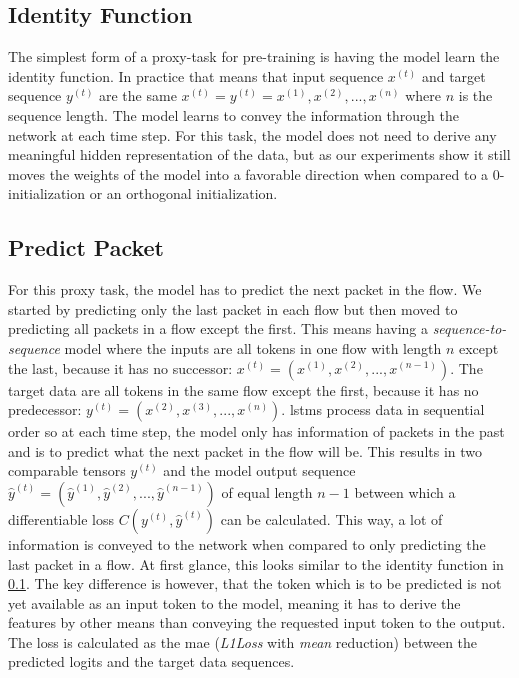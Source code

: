\subsection{Identity Function} \label{sec:experiments_lstm_identity}

The simplest form of a proxy-task for pre-training is having the model learn the identity function.
In practice that means that input sequence $x^{(t)}$ and target sequence $y^{(t)}$ are the same $x^{(t)} = y^{(t)} = x^{(1)}, x^{(2)}, ... , x^{(n)}$ where $n$ is the sequence length. The model learns to convey the information through the network at each time step. For this task, the model does not need to derive any meaningful hidden representation of the data, but as our experiments show it still moves the weights of the model into a favorable direction when compared to a 0-initialization or an orthogonal initialization. 

\subsection{Predict Packet} \label{sec:experiments_lstm_predict_packet}

For this proxy task, the model has to predict the next packet in the flow. We started by predicting only the last packet in each flow but then moved to predicting all packets in a flow except the first. This means having a \textit{sequence-to-sequence} model where the inputs are all tokens in one flow with length $n$ except the last, because it has no successor: $x^{(t)} = (x^{(1)}, x^{(2)}, ..., x^{(n-1)})$. The target data are all tokens in the same flow except the first, because it has no predecessor: $y^{(t)} = (x^{(2)}, x^{(3)}, ..., x^{(n)})$. \glspl{lstm} process data in sequential order so at each time step, the model only has information of packets in the past and is to predict what the next packet in the flow will be. This results in two comparable tensors $y^{(t)}$ and the model output sequence $\hat{y}^{(t)} = (\hat{y}^{(1)}, \hat{y}^{(2)}, ..., \hat{y}^{(n-1)})$ of equal length $n-1$ between which a differentiable loss $C(y^{(t)},\hat{y}^{(t)})$ can be calculated. This way, a lot of information is conveyed to the network when compared to only predicting the last packet in a flow. At first glance, this looks similar to the identity function in \ref{sec:experiments_lstm_identity}. The key difference is however, that the token which is to be predicted is not yet available as an input token to the model, meaning it has to derive the features by other means than conveying the requested input token to the output. The loss is calculated as the \gls{mae} (\textit{L1Loss} with \textit{mean} reduction) between the predicted logits and the target data sequences.

